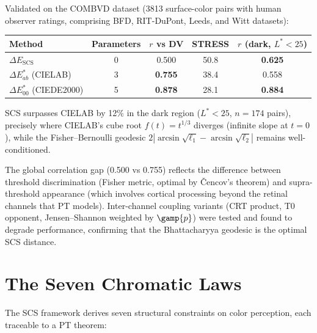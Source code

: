\documentclass[12pt,a4paper]{article}
\begin{document}
\medskip

Validated on the COMBVD dataset (3813 surface-color pairs with human
observer ratings, comprising BFD, RIT-DuPont, Leeds, and Witt datasets):
\begin{center}
\begin{tabular}{lcccc}
\toprule
Method & Parameters & $r$ vs DV & STRESS & $r$ (dark, $L^*<25$) \\
\midrule
$\Delta E_{\mathrm{SCS}}$ & 0 & 0.500 & 50.8 & \textbf{0.625} \\
$\Delta E^*_{ab}$ (CIELAB) & 3 & \textbf{0.755} & 38.4 & 0.558 \\
$\Delta E^*_{00}$ (CIEDE2000) & 5 & \textbf{0.878} & 28.1 & \textbf{0.884} \\
\bottomrule
\end{tabular}
\end{center}
SCS surpasses CIELAB by 12\% in the dark region ($L^* < 25$,
$n = 174$ pairs), precisely where CIELAB's cube root $f(t) = t^{1/3}$
diverges (infinite slope at $t = 0$), while the Fisher--Bernoulli
geodesic $2|\arcsin\sqrt{\ell_1} - \arcsin\sqrt{\ell_2}|$ remains
well-conditioned.

The global correlation gap (0.500 vs 0.755) reflects the difference
between threshold discrimination (Fisher metric, optimal by
\v{C}encov's theorem) and supra-threshold appearance (which involves
cortical processing beyond the retinal channels that PT models).
Inter-channel coupling variants (CRT product, T0 opponent,
Jensen--Shannon weighted by $\gamp{p}$) were tested and found to
degrade performance, confirming that the Bhattacharyya geodesic is the
optimal SCS distance.

\section{The Seven Chromatic Laws}
\label{sec:laws}

The SCS framework derives seven structural constraints on color
perception, each traceable to a PT theorem:
\end{document}
